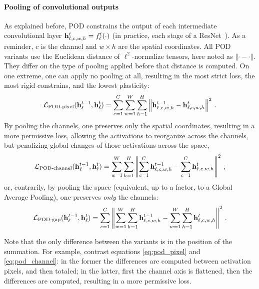\paragraph{Pooling of convolutional outputs} As explained before, POD constrains the output of each
intermediate convolutional layer $\mathbf{h}^{t}_{\ell,c,w,h} = f^{t}_\ell(\cdot)$ (in practice, each stage
of a ResNet~\citep{he2016resnet}). As a reminder, $c$ is the channel and $w\times h$ are the spatial
coordinates. All POD variants use the Euclidean distance of $\ell^2$-normalize tensors, here noted
as $\left\Vert\cdot-\cdot\right\Vert$. They differ on the type of pooling applied before that
distance is computed.
%
On one extreme, one can apply no pooling at all, resulting in the most strict loss, the most rigid
constrains, and the lowest plasticity:
%
\begin{equation}
    \mathcal{L}_{\text{POD-pixel}}(\mathbf{h}^{t-1}_\ell, \mathbf{h}^t_\ell) = \sum_{c=1}^C \sum_{w=1}^{W} \sum_{h=1}^{H} \left\Vert \mathbf{h}^{t-1}_{\ell,c,w,h} - \mathbf{h}^t_{\ell,c,w,h} \right\Vert^2\label{eq:pod_pixel}\,.
\end{equation}
%
By pooling the channels, one preserves only the spatial coordinates, resulting in a more permissive
loss, allowing the activations to reorganize across the channels, but penalizing global changes of
those activations across the space,
%
\begin{equation}
    \mathcal{L}_{\text{POD-channel}}(\mathbf{h}^{t-1}_\ell, \mathbf{h}^t_\ell)  = \sum_{w=1}^{W} \sum_{h=1}^{H} \left\Vert \sum_{c=1}^C \mathbf{h}^{t-1}_{\ell,c,w,h} - \sum_{c=1}^C \mathbf{h}^{t}_{\ell,c,w,h} \right\Vert^2\label{eq:pod_channel}\,;
\end{equation}
%
or, contrarily, by pooling the space (equivalent, up to a factor, to a Global Average Pooling), one
preserves \textit{only} the channels:
%
\begin{equation}
    \mathcal{L}_{\text{POD-gap}}(\mathbf{h}^{t-1}_\ell, \mathbf{h}^t_\ell) = \sum_{c=1}^{C} \left\Vert \sum_{w=1}^{W} \sum_{h=1}^H \mathbf{h}^{t-1}_{\ell,c,w,h} - \sum_{w=1}^{W} \sum_{h=1}^H \mathbf{h}^{t}_{\ell,c,w,h} \right\Vert^2\label{eq:pod_gap}\,.
\end{equation}
%

Note that the only difference between the variants is in the position of the summation. For example,
contrast equations \autoref{eq:pod_pixel} and \ref{eq:pod_channel}: in the former the differences
are computed between activation pixels, and then totaled; in the latter, first the channel axis is
flattened, then the differences are computed, resulting in a more permissive loss.

